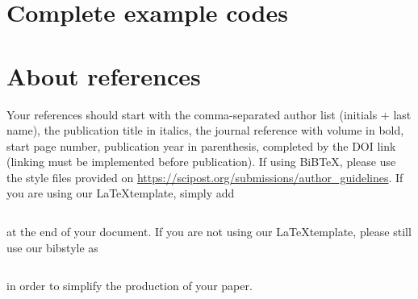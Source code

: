 \documentclass[submission, Phys]{SciPost}
\begin{document}
\begin{appendix}
\section{Complete example codes}

\section{About references}
Your references should start with the comma-separated author list (initials + last name), the publication title in italics, the journal reference with volume in bold, start page number, publication year in parenthesis, completed by the DOI link (linking must be implemented before publication). If using BiBTeX, please use the style files provided  on \url{https://scipost.org/submissions/author_guidelines}. If you are using our \LaTeX template, simply add
\begin{verbatim}

\end{verbatim}
at the end of your document. If you are not using our \LaTeX template, please still use our bibstyle as
\begin{verbatim}

\end{verbatim}
in order to simplify the production of your paper.
\end{appendix}






\nolinenumbers
\end{document}
